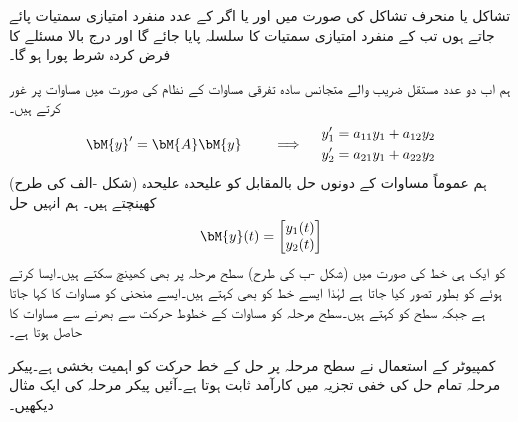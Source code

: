  تشاکل یا منحرف تشاکل   کی صورت میں اور یا اگر  کے  عدد منفرد امتیازی سمتیات پائے جاتے ہوں تب  کے منفرد امتیازی سمتیات کا سلسلہ پایا جائے گا اور درج بالا مسئلے کا فرض کردہ شرط پورا ہو گا۔


ہم اب  دو عدد مستقل  ضریب  والے متجانس سادہ تفرقی  مساوات کے نظام کی صورت میں مساوات  پر غور کرتے ہیں۔
\begin{gather}\label{مساوات_نظام_سطح_مرحلہ_الف}
\begin{aligned}
\bM{y}'=\bM{A}\bM{y}\quad 
\end{aligned}\quad \implies \quad 
\begin{aligned}
y_1'&=a_{11}y_1+a_{12}y_2\\
y_2'&=a_{21}y_1+a_{22}y_2
\end{aligned}
\end{gather}
ہم عموماً مساوات  کے دونوں حل بالمقابل  کو علیحدہ علیحدہ (شکل -الف کی طرح) کھینچتے ہیں۔ ہم انہیں حل
\begin{align}
\bM{y}(t)=\begin{bmatrix} y_1(t) \\ y_2(t) \end{bmatrix}
\end{align}
کو ایک ہی خط کی صورت میں (شکل -ب کی طرح) سطح مرحلہ پر بھی کھینچ سکتے ہیں۔ایسا کرتے ہوئے  کو بطور  تصور کیا جاتا ہے لہٰذا ایسے خط کو  بھی کہتے ہیں۔ایسے منحنی کو مساوات  کا  کہا جاتا ہے جبکہ  سطح کو  کہتے ہیں۔سطح مرحلہ کو مساوات  کے خطوط حرکت سے بھرنے سے  مساوات  کا  حاصل ہوتا ہے۔ 

کمپیوٹر کے استعمال نے سطح مرحلہ پر حل کے خط حرکت کو اہمیت بخشی ہے۔پیکر مرحلہ تمام حل کی خفی تجزیہ میں کارآمد ثابت ہوتا ہے۔آئیں پیکر مرحلہ کی ایک مثال دیکھیں۔

